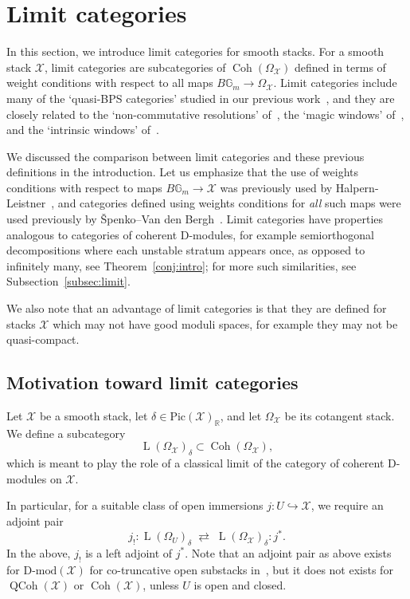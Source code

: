\documentclass [11pt,oneside,a4paper,mathscr]{amsart}
\theoremstyle{definition}
\newcommand{\LL}{\operatorname{L}}
\newcommand{\QCoh}{\operatorname{QCoh}}
\newcommand{\X}{\mathcal{X}}
\newcommand{\bgm}{B\mathbb{G}_m}
\newcommand{\Coh}{\operatorname{Coh}}
\begin{document}
\section{Limit categories}
In this section, we introduce limit categories for smooth stacks.
For a smooth stack $\X$, limit categories are subcategories of $\Coh(\Omega_\X)$ defined in terms of
weight conditions with respect to all maps $\bgm \to \Omega_\X$. 
Limit categories include many of the `quasi-BPS categories' studied in our previous work~\cite{PTquiver, PThiggs}, and they are closely related to the `non-commutative resolutions' of~\cite{SvdB},
the `magic windows' of~\cite{hls}, and the `intrinsic windows' of~\cite{T}. 

We discussed the comparison between limit categories and these previous definitions in the introduction. Let us emphasize that the use of weights conditions with respect to maps $\bgm\to\X$ was previously used by Halpern-Leistner~\cite{HalpTheta, HalpK32}, and categories defined using weights conditions for \textit{all} such maps were used previously by \v{S}penko--Van den Bergh~\cite{SvdB}. 
Limit categories have properties analogous to categories of coherent D-modules, for example semiorthogonal decompositions where each unstable stratum appears once, as opposed to infinitely many, see Theorem~\ref{conj:intro}; for more such similarities, see Subsection~\ref{subsec:limit}.   


We also note that an advantage of limit categories is that they are defined 
for stacks $\X$ which may not have good moduli spaces, for example they may not be quasi-compact.

\subsection{Motivation toward limit categories}
Let $\X$ be a smooth stack, let $\delta \in \mathrm{Pic}(\X)_{\mathbb{R}}$, and let $\Omega_{\X}$ be
its cotangent stack. We define a subcategory
\[
  \LL(\Omega_{\X})_\delta \subset \Coh(\Omega_{\X}),
\]
which is meant to play the role of a classical limit of the
category of coherent D-modules on $\X$.

In particular, for a suitable class of open immersions $j\colon U \hookrightarrow \X$,
we require an adjoint pair
\[
  j_! \colon \LL(\Omega_U)_\delta \;\rightleftarrows\; \LL(\Omega_{\X})_\delta \colon j^* .
\]
In the above, $j_!$ is a left adjoint of $j^*$. 
Note that an adjoint pair as above exists for $\text{D-mod}(\X)$ for 
co-truncative open substacks in~\cite{DGbun}, but it does not exists for $\QCoh(\X)$ or $\Coh(\X)$, unless
$U$ is open and closed. 
\end{document}
